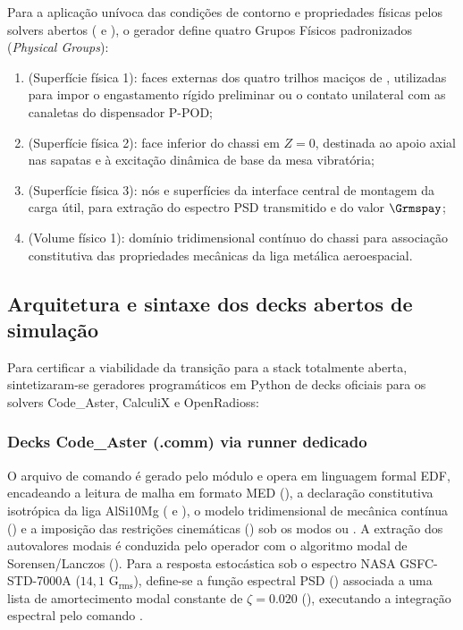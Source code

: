 Para a aplicação unívoca das condições de contorno e propriedades físicas pelos solvers abertos ( e ), o gerador define quatro Grupos Físicos padronizados (\textit{Physical Groups}):
\begin{enumerate}
  \item {} (Superfície física 1): faces externas dos quatro trilhos maciços de \rail{}, utilizadas para impor o engastamento rígido preliminar ou o contato unilateral com as canaletas do dispensador P-POD;
  \item {} (Superfície física 2): face inferior do chassi em $Z = 0$, destinada ao apoio axial nas sapatas e à excitação dinâmica de base da mesa vibratória;
  \item {} (Superfície física 3): nós e superfícies da interface central de montagem da carga útil, para extração do espectro PSD transmitido e do valor $\Grmspay$;
  \item {} (Volume físico 1): domínio tridimensional contínuo do chassi para associação constitutiva das propriedades mecânicas da liga metálica aeroespacial.
\end{enumerate}

\subsection{Arquitetura e sintaxe dos decks abertos de simulação}
\label{subsec:decks-abertos}

Para certificar a viabilidade da transição para a stack totalmente aberta, sintetizaram-se geradores programáticos em Python de decks oficiais para os solvers Code\_Aster, CalculiX e OpenRadioss:

\subsubsection{Decks Code\_Aster (.comm) via runner dedicado}
\label{subsubsec:codeaster}
O arquivo de comando é gerado pelo módulo  e opera em linguagem formal EDF, encadeando a leitura de malha em formato MED (), a declaração constitutiva isotrópica da liga AlSi10Mg ( e ), o modelo tridimensional de mecânica contínua () e a imposição das restrições cinemáticas () sob os modos  ou . A extração dos autovalores modais é conduzida pelo operador  com o algoritmo modal de Sorensen/Lanczos (). Para a resposta estocástica sob o espectro NASA GSFC-STD-7000A ($14{,}1\text{ G}_{\text{rms}}$), define-se a função espectral PSD () associada a uma lista de amortecimento modal constante de $\zeta = \num{0.020}$ (), executando a integração espectral pelo comando .

